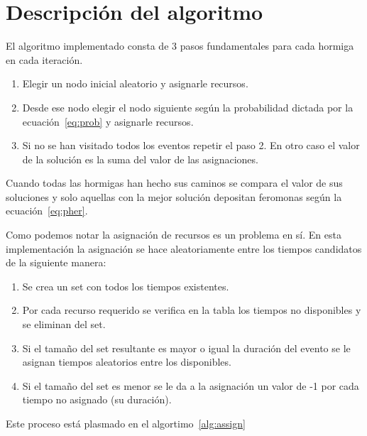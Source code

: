 \documentclass[letter, 10pt]{article}
\begin{document}
\section{Descripción del algoritmo}\label{sec:alg}
El algoritmo implementado consta de 3 pasos fundamentales para cada hormiga en
cada iteración.
\begin{enumerate}
  \item
    Elegir un nodo inicial aleatorio y asignarle recursos.
  \item
    Desde ese nodo elegir el nodo siguiente según la probabilidad dictada por la
    ecuación~\ref{eq:prob} y asignarle recursos.
  \item
    Si no se han visitado todos los eventos repetir el paso 2. En otro caso el
    valor de la solución es la suma del valor de las asignaciones.
\end{enumerate}

Cuando todas las hormigas han hecho sus caminos se compara el valor de sus
soluciones y solo aquellas con la mejor solución depositan feromonas según la
ecuación~\ref{eq:pher}.

Como podemos notar la asignación de recursos es un problema en sí. En esta
implementación la asignación se hace aleatoriamente entre los tiempos
candidatos de la siguiente manera:
\begin{enumerate}
  \item
    Se crea un set con todos los tiempos existentes.
  \item
    Por cada recurso requerido se verifica en la tabla los tiempos no
    disponibles y se eliminan del set.
  \item
    Si el tamaño del set resultante es mayor o igual la duración del evento se
    le asignan tiempos aleatorios entre los disponibles.
  \item
    Si el tamaño del set es menor se le da a la asignación un valor de -1 por
    cada tiempo no asignado (su duración).
\end{enumerate}

Este proceso está plasmado en el algortimo~\ref{alg:assign}
\end{document}
